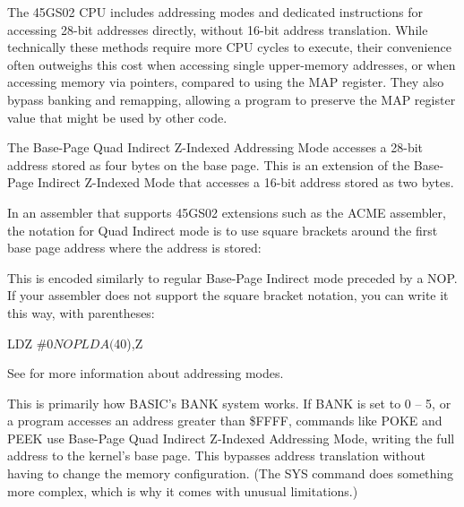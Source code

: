 The 45GS02 CPU includes addressing modes and dedicated instructions for
accessing 28-bit addresses directly, without 16-bit address translation. While
technically these methods require more CPU cycles to execute, their convenience
often outweighs this cost when accessing single upper-memory addresses, or when
accessing memory via pointers, compared to using the MAP register. They also
bypass banking and remapping, allowing a program to preserve the MAP register
value that might be used by other code.

The Base-Page Quad Indirect Z-Indexed Addressing Mode accesses a 28-bit address
stored as four bytes on the base page. This is an extension of the Base-Page
Indirect Z-Indexed Mode that accesses a 16-bit address stored as two bytes.

In an assembler that supports 45GS02 extensions such as the ACME assembler, the
notation for Quad Indirect mode is to use square brackets around the first base
page address where the address is stored:


This is encoded similarly to regular Base-Page Indirect mode preceded by a NOP.
If your assembler does not support the square bracket notation, you can write
it this way, with parentheses:

\begin{screenoutput}
LDZ #$0
NOP
LDA ($40),Z
\end{screenoutput}

See  for more information about addressing modes.

This is primarily how BASIC's BANK system works. If BANK is set to 0 -- 5, or
a program accesses an address greater than \$FFFF, commands like POKE and
PEEK use Base-Page Quad Indirect Z-Indexed Addressing Mode, writing the full address
to the kernel's base page. This bypasses address translation without having to change
the memory configuration. (The SYS command does something more complex, which is
why it comes with unusual limitations.)


